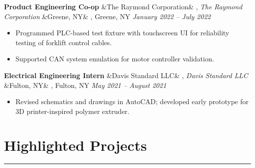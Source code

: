 \documentclass[letterpaper,10pt]{article}
\newcommand{\heading}[1]{%
    \vspace{-5mm} %
    \section*{#1}%
    \vspace{-3mm}%
    \noindent\hrule height 0.5pt %
    \vspace{4mm}%
}
\newcommand{\experience}[5]{%
    \noindent\textbf{#1}%
    \ifx&#2&
    \else
        , \textit{#2}%
    \fi
    \ifx&#3&
    \else
        , #3%
    \fi
    \hfill \textit{#4} \\
    \vspace{-6.8mm}%
    \begin{itemize}[itemsep=-5pt]
        \setlength{\itemindent}{0em}
        #5
    \end{itemize}
    \vspace{1mm}
}
\begin{document}
\experience
    {Product Engineering Co-op}
    {The Raymond Corporation}
    {Greene, NY}
    {January 2022 – July 2022}
    {
        \item Programmed PLC-based test fixture with touchscreen UI for reliability testing of forklift control cables.
        
        \item Supported CAN system emulation for motor controller validation.


    }

\experience
    {Electrical Engineering Intern}
    {Davis Standard LLC}
    {Fulton, NY}
    {May 2021 – August 2021}
    {
        \item Revised schematics and drawings in AutoCAD; developed early prototype for 3D printer-inspired polymer extruder.
        

    }
    


\vspace{-0.5em}
\heading{Highlighted Projects}

    
\end{document}
